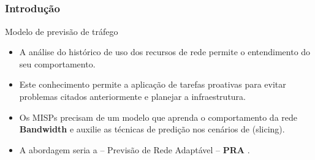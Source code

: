 \documentclass[aspectratio=169]{beamer}
\begin{document}

\subsection{}
\begin{frame}
\frametitle{Introdução}
\begin{block}{Modelo de previsão de tráfego}
    \begin{itemize}
    \item A análise do histórico de uso dos recursos de rede permite o entendimento do seu comportamento.
        \item Este conhecimento permite a aplicação de tarefas proativas para evitar problemas citados anteriormente e planejar a infraestrutura.
        \item Os MISPs precisam de um modelo que aprenda o comportamento da rede \textbf{Bandwidth} e auxilie as técnicas de predição nos cenários de (slicing).
        \item A abordagem seria a -- Previsão de Rede Adaptável -- \textbf{PRA} .
    \end{itemize}
\end{block}
\end{frame}

\end{document}
